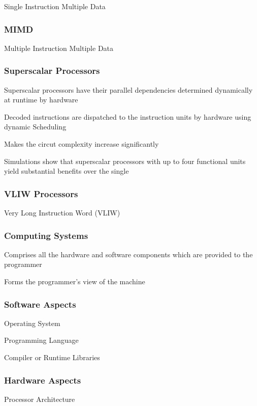 \documentclass{article}
\begin{document}
Single Instruction Multiple Data

\subsubsection{MIMD}

Multiple Instruction Multiple Data

\subsubsection{Superscalar Processors}

Superscalar processors have their parallel dependencies determined dynamically at runtime by hardware

Decoded instructions are dispatched to the instruction units by hardware using dynamic Scheduling

Makes the circut complexity increase significantly

Simulations show that superscalar processors with up to four functional units yield substantial benefits over the single

\subsubsection{VLIW Processors}

Very Long Instruction Word (VLIW)

\subsubsection{Computing Systems}

Comprises all the hardware and software components which are provided to the programmer

Forms the programmer's view of the machine

\subsubsection{Software Aspects}

Operating System

Programming Language

Compiler or Runtime Libraries

\subsubsection{Hardware Aspects}

Processor Architecture
\end{document}
